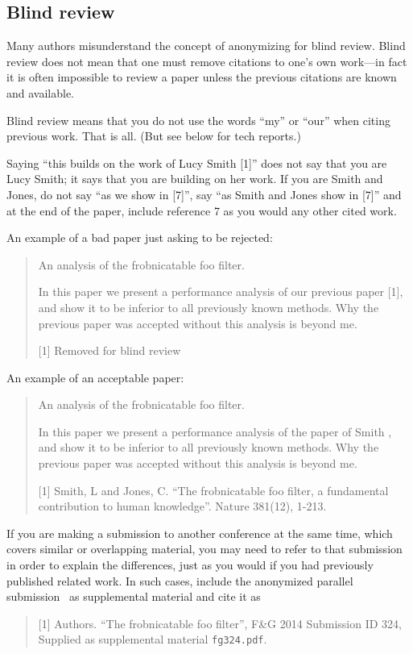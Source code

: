 \documentclass[10pt,twocolumn,letterpaper]{article}
\begin{document}
\subsection{Blind review}

Many authors misunderstand the concept of anonymizing for blind review.
Blind review does not mean that one must remove citations to one's own work---in fact it is often impossible to review a paper unless the previous citations are known and available.

Blind review means that you do not use the words ``my'' or ``our'' when citing previous work.
That is all.
(But see below for tech reports.)

Saying ``this builds on the work of Lucy Smith [1]'' does not say that you are Lucy Smith;
it says that you are building on her work.
If you are Smith and Jones, do not say ``as we show in [7]'', say ``as Smith and Jones show in [7]'' and at the end of the paper, include reference 7 as you would any other cited work.

An example of a bad paper just asking to be rejected:
\begin{quote}
\begin{center}
    An analysis of the frobnicatable foo filter.
\end{center}

   In this paper we present a performance analysis of our previous paper [1], and show it to be inferior to all previously known methods.
   Why the previous paper was accepted without this analysis is beyond me.

   [1] Removed for blind review
\end{quote}


An example of an acceptable paper:
\begin{quote}
\begin{center}
     An analysis of the frobnicatable foo filter.
\end{center}

   In this paper we present a performance analysis of the  paper of Smith \etal [1], and show it to be inferior to all previously known methods.
   Why the previous paper was accepted without this analysis is beyond me.

   [1] Smith, L and Jones, C. ``The frobnicatable foo filter, a fundamental contribution to human knowledge''. Nature 381(12), 1-213.
\end{quote}

If you are making a submission to another conference at the same time, which covers similar or overlapping material, you may need to refer to that submission in order to explain the differences, just as you would if you had previously published related work.
In such cases, include the anonymized parallel submission~\cite{Authors14} as supplemental material and cite it as
\begin{quote}
[1] Authors. ``The frobnicatable foo filter'', F\&G 2014 Submission ID 324, Supplied as supplemental material {\tt fg324.pdf}.
\end{quote}
\end{document}

